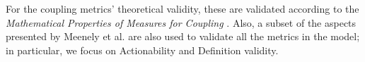For the coupling metrics' theoretical validity, these are validated according to the \textit{Mathematical Properties of Measures for Coupling} \cite{srinivasan2014software}. Also, a subset of the aspects presented by Meenely et al. \cite{Meneely2012} are also used to validate all the metrics in the model; in particular, we focus on Actionability and Definition validity.
